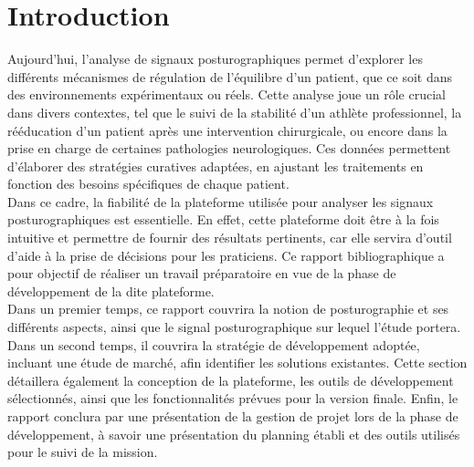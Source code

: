 \section{Introduction}

Aujourd’hui, l’analyse de signaux posturographiques permet d’explorer les différents mécanismes de 
régulation de l’équilibre d’un patient, que ce soit dans des environnements expérimentaux ou réels. 
Cette analyse joue un rôle crucial dans divers contextes, tel que le suivi de la stabilité d’un athlète 
professionnel, la rééducation d’un patient après une intervention chirurgicale, ou encore dans la prise 
en charge de certaines pathologies neurologiques. Ces données permettent d’élaborer des stratégies 
curatives adaptées, en ajustant les traitements en fonction des besoins spécifiques de chaque patient.\\
Dans ce cadre, la fiabilité de la plateforme utilisée pour analyser les signaux posturographiques est 
essentielle. En effet, cette plateforme doit être à la fois intuitive et permettre de fournir des 
résultats pertinents, car elle servira d’outil d’aide à la prise de décisions pour les praticiens. 
Ce rapport bibliographique a pour objectif de réaliser un travail préparatoire en vue de la phase de 
développement de la dite plateforme.\\
Dans un premier temps, ce rapport couvrira la notion de posturographie et ses différents aspects, 
ainsi que le signal posturographique sur lequel l’étude portera. Dans un second temps, il couvrira la 
stratégie de développement adoptée, incluant une étude de marché, afin identifier les solutions 
existantes.  Cette section détaillera également la conception de la plateforme, les outils de 
développement sélectionnés, ainsi que les fonctionnalités prévues pour la version finale. Enfin, 
le rapport conclura par une présentation de la gestion de projet lors de la phase de développement, 
à savoir une présentation du planning établi et des outils utilisés pour le suivi de la mission.
